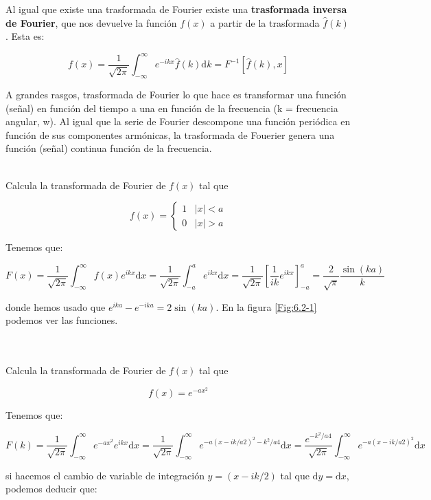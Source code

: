 \documentclass[12pt,a4paper]{book}
\newcommand{\D}{\mathrm{d}}
\newcommand{\inti}{\int_{-\infty}^{\infty}}
\newcommand{\hatf}{\widehat{f}}
\begin{document}
Al igual que existe una trasformada de Fourier existe una \textbf{trasformada inversa de Fourier}, que nos devuelve la función $f(x)$ a partir de la trasformada $\hatf(k)$. Esta es:

\begin{equation}
f(x) = \dfrac{1}{\sqrt{2 \pi}} \inti e^{-ikx} \hatf (k) \D k = F^{-1}[\hatf (k),x]
\end{equation}

A grandes rasgos, trasformada de Fourier lo que hace es transformar una función (señal) en función del tiempo a una en función de la frecuencia (k = frecuencia angular, w). Al igual que la serie de Fourier descompone una función periódica en función de sus componentes armónicas, la trasformada de Fouerier genera una función (señal) continua función de la frecuencia.\\



\hrulefill \\


Calcula la transformada de Fourier de $f(x)$ tal que

$$ f(x) = \left\lbrace \begin{array}{ll}
1 & |x|<a \\
0 & |x|>a 
\end{array} \right. $$

Tenemos que:

$$ F(x) = \dfrac{1}{\sqrt{2 \pi}} \inti f(x) e^{ikx} \D x =  \dfrac{1}{\sqrt{2 \pi}} \int_{-a}^a  e^{ikx} \D x =   \dfrac{1}{\sqrt{2 \pi}} \left[ \dfrac{1}{ik} e^{ikx} \right]_{-a}^a = \dfrac{2}{\sqrt{\pi}}  \dfrac{\sin (ka)}{k}  $$

donde hemos usado que $e^{ika}-e^{-ika} = 2 \sin(ka)$. En la figura \ref{Fig:6.2-1} podemos ver las funciones.

\hrulefill \\

\hrulefill \\


Calcula la transformada de Fourier de $f(x)$ tal que

$$ f(x) = e^{-ax^2}$$

Tenemos que:

$$ F(k) = \dfrac{1}{\sqrt{2 \pi}} \inti e^{-ax^2} e^{ikx} \D x =  \dfrac{1}{\sqrt{2 \pi}} \inti e^{-a(x-ik/a2)^2 - k^2/a4} \D x =  \dfrac{e^{-k^2/a4}}{\sqrt{2 \pi}} \inti e^{-a(x-ik/a2)^2} \D x $$

si hacemos el cambio de variable de integración $y = (x-ik/2)$ tal que $\D y = \D x$, podemos deducir que:
\end{document}
